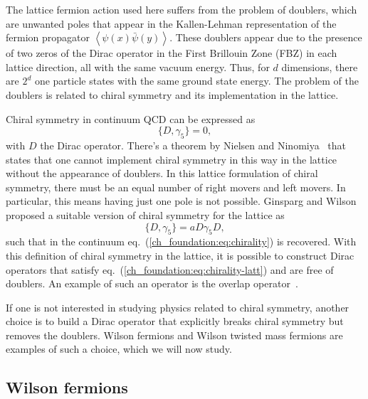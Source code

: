 The lattice fermion action used here suffers from the problem of doublers, which are unwanted poles that appear in the Kallen-Lehman representation of the fermion propagator $\left<\psi(x)\bar{\psi}(y)\right>$. These doublers appear due to the presence of two zeros of the Dirac operator in the First Brillouin Zone (FBZ) in each lattice direction, all with the same vacuum energy.  Thus, for $d$ dimensions, there are $2^d$ one particle states with the same ground state energy. The problem of the doublers is related to chiral symmetry and its implementation in the lattice.

Chiral symmetry in continuum QCD can be expressed as 
\begin{equation}
\label{ch_foundation:eq:chirality}
\{D,\gamma_5\}=0,
\end{equation}
with $D$ the Dirac operator. There's a theorem by Nielsen and Ninomiya~\cite{} that states that one cannot implement chiral symmetry in this way in the lattice without the appearance of doublers.
In this lattice formulation of chiral symmetry, there must be an equal number of right movers and left movers. In particular, this means having just one pole is not possible. Ginsparg and Wilson~\cite{} proposed a suitable version of chiral symmetry for the lattice as
\begin{equation}
\label{ch_foundation:eq:chirality-latt}
\{D,\gamma_5\}=aD\gamma_5D,
\end{equation}
such that in the continuum eq.~(\ref{ch_foundation:eq:chirality}) is recovered. With this definition of chiral symmetry in the lattice, it is possible to construct Dirac operators that satisfy eq.~(\ref{ch_foundation:eq:chirality-latt}) and are free of doublers. An example of such an operator is the overlap operator~\cite{}.

If one is not interested in studying physics related to chiral symmetry, another choice is to build a Dirac operator that explicitly breaks chiral symmetry but removes the doublers. Wilson fermions and Wilson twisted mass fermions are examples of such a choice, which we will now study.


\subsection{Wilson fermions}
\label{ch_foundation:subsec:Wilson}

